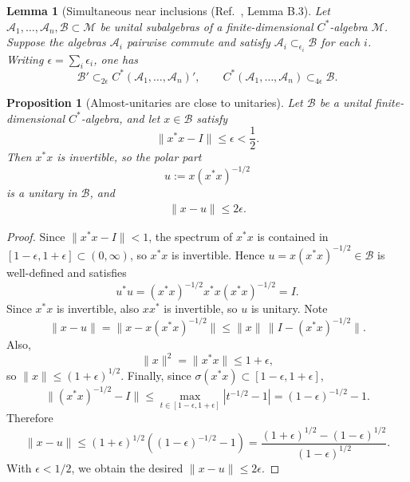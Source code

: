 \documentclass[11pt,reqno]{amsart}
\newtheorem{lemma}[theorem]{Lemma}
\newtheorem{proposition}[theorem]{Proposition}
\theoremstyle{definition}
\theoremstyle{remark}
\numberwithin{equation}{section}
\newcommand{\cB}{\mathcal B}
\begin{document}
\begin{lemma}[Simultaneous near inclusions (Ref.~\cite{ranard2022converse}, Lemma B.3]\label{lemma:simultaneous-near-inclusions}
Let $\mathcal{A}_1,\ldots,\mathcal{A}_n,\mathcal{B} \subset \mathcal{M}$ be unital subalgebras of a finite-dimensional $C^*$-algebra $\mathcal{M}$. Suppose the algebras $\mathcal{A}_i$ pairwise commute and satisfy $\mathcal{A}_i \subset_{\epsilon_i} \mathcal{B}$ for each $i$. Writing $\epsilon = \sum_i \epsilon_i$, one has
\[
\mathcal{B}' \subset_{2\epsilon} C^*(\mathcal{A}_1,\ldots,\mathcal{A}_n)', \qquad C^*(\mathcal{A}_1,\ldots,\mathcal{A}_n) \subset_{4\epsilon} \mathcal{B}.
\]
\end{lemma}


\begin{proposition}[Almost-unitaries are close to unitaries]\label{prop:almost-unitary-polar}
Let $\cB$ be a unital finite-dimensional $C^*$-algebra, and let $x \in \cB$ satisfy
\[
\|x^*x-I\| \le \epsilon < \frac12.
\]
Then $x^*x$ is invertible, so the polar part
\[
u := x(x^*x)^{-1/2}
\]
is a unitary in $\cB$, and
\begin{align}
\|x-u\| \le 2\epsilon.
\end{align}
\end{proposition}

\begin{proof}
Since $\|x^*x-I\|<1$, the spectrum of $x^*x$ is contained in $[1-\epsilon,1+\epsilon] \subset (0,\infty)$, so $x^*x$ is invertible. Hence $u=x(x^*x)^{-1/2} \in \cB$ is well-defined and satisfies
\[
u^*u=(x^*x)^{-1/2}x^*x(x^*x)^{-1/2}=I.
\]
Since $x^*x$ is invertible, also $xx^*$ is invertible, so $u$ is unitary. Note
\[
\|x-u\|
=
\|x-x(x^*x)^{-1/2}\|
\le
\|x\|\,\|I-(x^*x)^{-1/2}\|.
\]
Also,
\[
\|x\|^2=\|x^*x\| \le 1+\epsilon,
\]
so $\|x\| \le (1+\epsilon)^{1/2}$. Finally, since $\sigma(x^*x)\subset [1-\epsilon,1+\epsilon]$,
\[
\|(x^*x)^{-1/2}-I\|
\le
\max_{t\in[1-\epsilon,1+\epsilon]} |t^{-1/2}-1|
=
(1-\epsilon)^{-1/2}-1.
\]
Therefore
\[
\|x-u\|
\le
(1+\epsilon)^{1/2}\left((1-\epsilon)^{-1/2}-1\right)
=
\frac{(1+\epsilon)^{1/2}-(1-\epsilon)^{1/2}}{(1-\epsilon)^{1/2}}.
\]
With $\epsilon<1/2$,  we obtain the desired $\|x-u\|\le 2\epsilon$.
\end{proof}
\end{document}
